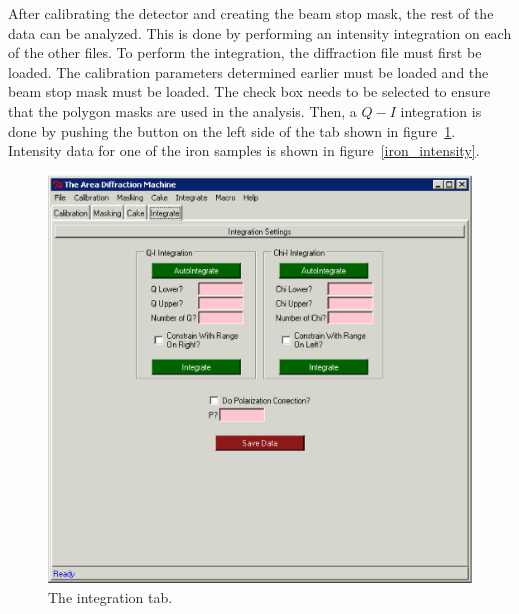 After calibrating the detector and creating the beam stop mask, 
the rest of the data can be analyzed. This is done by 
performing an intensity integration on each of the other files.
To perform the integration, the diffraction file must first be loaded.
The calibration parameters determined earlier must be loaded and the
beam stop mask must be loaded. The  check box needs to
be selected to ensure that the polygon masks are used in the analysis.
Then, a $Q-I$ integration is done by pushing the  button 
on the left side of the  tab
shown in figure~\ref{integration_tab_example}.
Intensity data for one of the iron samples is shown in 
figure~\ref{iron_intensity}.

\begin{figure}
    \centering
    \includegraphics[scale=.75]
    {figures/integration_tab.eps}
    \caption{The integration tab.}
    \label{integration_tab_example}
\end{figure}

